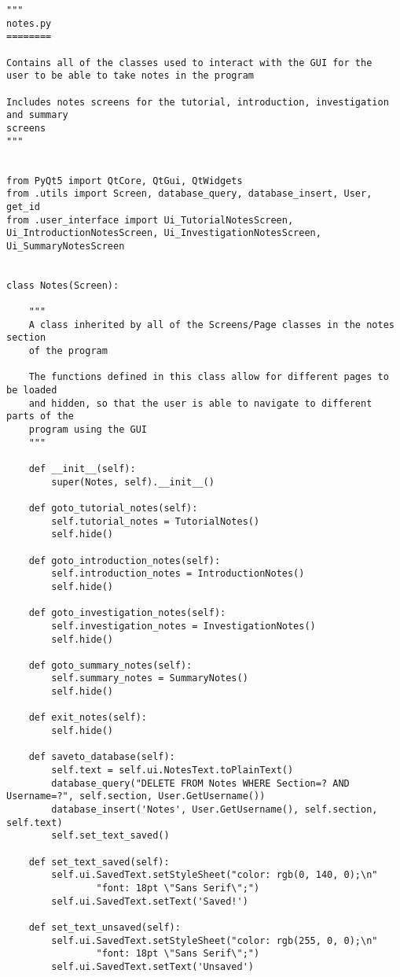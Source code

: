 \documentclass{article}
\begin{document}
\begin{lstlisting}
"""
notes.py
========

Contains all of the classes used to interact with the GUI for the
user to be able to take notes in the program

Includes notes screens for the tutorial, introduction, investigation and summary
screens
"""


from PyQt5 import QtCore, QtGui, QtWidgets
from .utils import Screen, database_query, database_insert, User, get_id
from .user_interface import Ui_TutorialNotesScreen, Ui_IntroductionNotesScreen, Ui_InvestigationNotesScreen, Ui_SummaryNotesScreen


class Notes(Screen):

    """
    A class inherited by all of the Screens/Page classes in the notes section
    of the program

    The functions defined in this class allow for different pages to be loaded
    and hidden, so that the user is able to navigate to different parts of the
    program using the GUI
    """

    def __init__(self):
        super(Notes, self).__init__()

    def goto_tutorial_notes(self):
        self.tutorial_notes = TutorialNotes()
        self.hide()

    def goto_introduction_notes(self):
        self.introduction_notes = IntroductionNotes()
        self.hide()

    def goto_investigation_notes(self):
        self.investigation_notes = InvestigationNotes()
        self.hide()

    def goto_summary_notes(self):
        self.summary_notes = SummaryNotes()
        self.hide()

    def exit_notes(self):
        self.hide()

    def saveto_database(self):
        self.text = self.ui.NotesText.toPlainText()
        database_query("DELETE FROM Notes WHERE Section=? AND Username=?", self.section, User.GetUsername())
        database_insert('Notes', User.GetUsername(), self.section, self.text)
        self.set_text_saved()

    def set_text_saved(self):
        self.ui.SavedText.setStyleSheet("color: rgb(0, 140, 0);\n"
                "font: 18pt \"Sans Serif\";")
        self.ui.SavedText.setText('Saved!')

    def set_text_unsaved(self):
        self.ui.SavedText.setStyleSheet("color: rgb(255, 0, 0);\n"
                "font: 18pt \"Sans Serif\";")
        self.ui.SavedText.setText('Unsaved')


\end{lstlisting}
\end{document}
